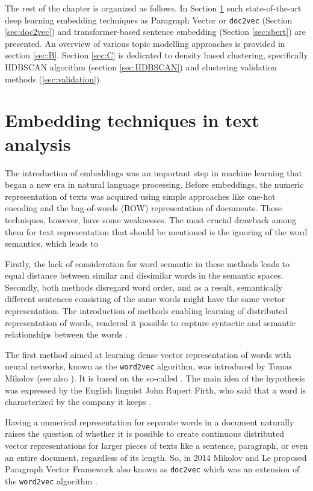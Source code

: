 \documentclass[fontsize=12pt,a4paper,twoside,openany]{scrbook}
\begin{document}
The rest of the chapter is organized as follows. In Section \ref{sec:A} such state-of-the-art deep learning embedding techniques as Paragraph Vector or \verb|doc2vec| (Section \ref{sec:doc2vec}) and transformer-based sentence embedding (Section \ref{sec:sbert}) are presented. An overview of various topic modelling approaches is provided in section \ref{sec:B}. Section \ref{sec:C} is dedicated to density based clustering, specifically HDBSCAN algorithm (section \ref{sec:HDBSCAN}) and clustering validation methods (\ref{sec:validation}).  

\section{Embedding techniques in text analysis}
\label{sec:A}

The introduction of embeddings was an important step in machine learning that began a new era in natural language processing. Before embeddings, the numeric representation of texts was acquired using simple approaches like one-hot encoding and the bag-of-words (BOW) representation of documents. These techniques, however, have some weaknesses. The most crucial drawback among them for text representation that should be mentioned is the ignoring of the word semantics, which leads to 



Firstly, the lack of consideration for word semantic in these methods leads to equal distance between similar and dissimilar words in the semantic spaces. Secondly, both methods disregard word order, and as a result, semantically different sentences consisting of the same words might have the same vector representation. The introduction of methods enabling learning of distributed representation of words, rendered it possible to capture syntactic and semantic relationships between the words \parencite{Le14}. 

The first method aimed at learning dense vector representation of words with neural networks, known as the \verb|word2vec| algorithm, was introduced by Tomas Mikolov \parencite{TMikolov13} (see also \parencite{Mikolov13}). It is based on the so-called  \parencite{Harris54}. The main idea of the hypothesis was expressed by the English linguist John Rupert Firth, who said that a word is characterized by the company it keeps \parencite{Firth57}.

Having a numerical representation for separate words in a document naturally raises the question of whether it is possible to create continuous distributed vector representations for larger pieces of texts like a sentence, paragraph, or even an entire document, regardless of its length. So, in 2014 Mikolov and Le proposed Paragraph Vector Framework also known as \verb|doc2vec| which was an extension of the \verb|word2vec| algorithm \parencite[see][]{Le14}.
\end{document}
